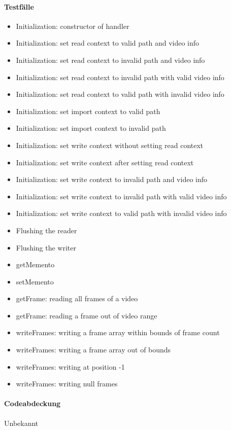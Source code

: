 \paragraph*{Testfälle}
\begin{itemize}
\item Initialization: constructor of handler
\item Initialization: set read context to valid path and video info
\item Initialization: set read context to invalid path and video info
\item Initialization: set read context to invalid path with valid video info
\item Initialization: set read context to valid path with invalid video info
\item Initialization: set import context to valid path
\item Initialization: set import context to invalid path
\item Initialization: set write context without setting read context
\item Initialization: set write context after setting read context
\item Initialization: set write context to invalid path and video info
\item Initialization: set write context to invalid path with valid video info
\item Initialization: set write context to valid path with invalid video info
\item Flushing the reader
\item Flushing the writer
\item getMemento
\item setMemento
\item getFrame: reading all frames of a video
\item getFrame: reading a frame out of video range
\item writeFrames: writing a frame array within bounds of frame count
\item writeFrames: writing a frame array out of bounds
\item writeFrames: writing at position -1
\item writeFrames: writing null frames
\end{itemize}

\paragraph*{Codeabdeckung}
Unbekannt

